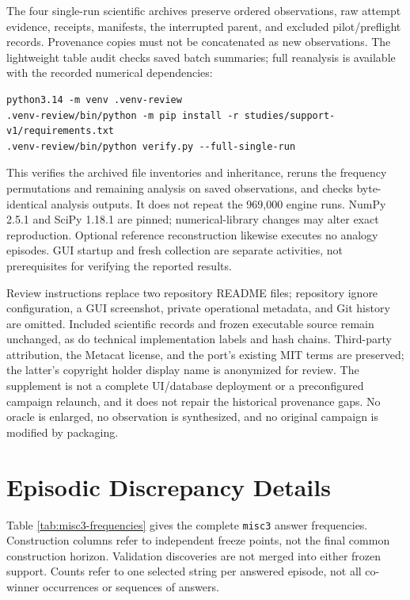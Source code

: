 \documentclass[10pt,letterpaper]{article}
\begin{document}
The four single-run scientific archives preserve ordered observations, raw attempt
evidence, receipts, manifests, the interrupted parent, and excluded pilot/preflight
records. Provenance copies must not be concatenated as new observations. The lightweight
table audit checks saved batch summaries; full reanalysis is available with the recorded
numerical dependencies:

\begin{verbatim}
python3.14 -m venv .venv-review
.venv-review/bin/python -m pip install -r studies/support-v1/requirements.txt
.venv-review/bin/python verify.py --full-single-run
\end{verbatim}

This verifies the archived file inventories and inheritance, reruns the frequency
permutations and remaining analysis on saved observations, and checks byte-identical
analysis outputs. It does not repeat the 969,000 engine runs. NumPy 2.5.1 and SciPy 1.18.1
are pinned; numerical-library changes may alter exact reproduction. Optional reference
reconstruction likewise executes no analogy episodes. GUI startup and fresh collection are
separate activities, not prerequisites for verifying the reported results.

Review instructions replace two repository README files; repository ignore configuration,
a GUI screenshot, private operational metadata, and Git history are omitted. Included
scientific records and frozen executable source remain unchanged, as do technical
implementation labels and hash chains. Third-party attribution, the Metacat license, and
the port's existing MIT terms are preserved; the latter's copyright holder display name is
anonymized for review. The supplement is not a complete UI/database deployment or a
preconfigured campaign relaunch, and it does not repair the historical provenance gaps. No
oracle is enlarged, no observation is synthesized, and no original campaign is modified by
packaging.

\clearpage

\section{Episodic Discrepancy Details}\label{app:misc3}

Table \ref{tab:misc3-frequencies} gives the complete \texttt{misc3} answer frequencies.
Construction columns refer to independent freeze points, not the final common construction
horizon. Validation discoveries are not merged into either frozen support. Counts refer to
one selected string per answered episode, not all co-winner occurrences or sequences of
answers.
\end{document}
